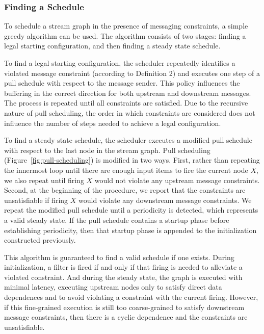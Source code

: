\subsubsection*{Finding a Schedule}

To schedule a stream graph in the presence of messaging constraints, a
simple greedy algorithm can be used.  The algorithm consists of two
stages: finding a legal starting configuration, and then finding a
steady state schedule.

To find a legal starting configuration, the scheduler repeatedly
identifies a violated message constraint (according to Definition 2)
and executes one step of a pull schedule with respect to the message
sender.  This policy influences the buffering in the correct direction
for both upstream and downstream messages.  The process is repeated
until all constraints are satisfied.  Due to the recursive nature of
pull scheduling, the order in which constraints are considered does
not influence the number of steps needed to achieve a legal
configuration.

To find a steady state schedule, the scheduler executes a modified
pull schedule with respect to the last node in the stream graph.  Pull
scheduling (Figure~\ref{fig:pull-scheduling}) is modified in two ways.
First, rather than repeating the innermost loop until there are enough
input items to fire the current node $X$, we also repeat until firing
$X$ would not violate any upstream message constraints.  Second, at
the beginning of the procedure, we report that the constraints are
unsatisfiable if firing $X$ would violate any downstream message
constraints.  We repeat the modified pull schedule until a periodicity
is detected, which represents a valid steady state.  If the pull
schedule contains a startup phase before establishing periodicity,
then that startup phase is appended to the initialization constructed
previously.

This algorithm is guaranteed to find a valid schedule if one exists.
During initialization, a filter is fired if and only if that firing is
needed to alleviate a violated constraint.  And during the steady
state, the graph is executed with minimal latency, executing upstream
nodes only to satisfy direct data dependences and to avoid violating a
constraint with the current firing.  However, if this fine-grained
execution is still too coarse-grained to satisfy downstream message
constraints, then there is a cyclic dependence and the constraints are
unsatisfiable.

